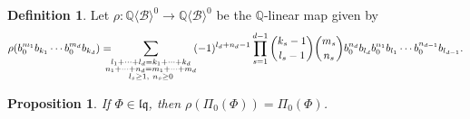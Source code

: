 \documentclass[12pt,reqno]{amsart}
\newtheorem{prop}[thm]{Proposition}
\numberwithin{equation}{section}
\theoremstyle{definition}
\newtheorem{defi}[thm]{Definition}
\newcommand{\QQ}{\mathbb{Q}}
\newcommand{\B}{\mathcal{B}}
\newcommand{\QB}{\QQ\langle \B\rangle}
\newcommand{\lqq}{\mathfrak{lq}}
\newcommand{\pizero}{\Pi_0}
\begin{document}
\begin{defi} \label{def:rho} Let $\rho:\QB^0\to \QB^0$ be the $\QQ$-linear map given by
\[\rho(b_0^{m_1}b_{k_1}\cdots b_0^{m_d}b_{k_d})=\hspace{-0.3cm}\sum_{\substack{l_1+\cdots+l_d=k_1+\cdots+k_d \\ n_1+\cdots+n_d=m_1+\cdots+m_d \\ l_s\geq1,\ n_s\geq0}} \hspace{-0.1cm} (-1)^{l_d+n_d-1}\prod_{s=1}^{d-1} \binom{k_s-1}{l_s-1}\binom{m_s}{n_s} b_0^{n_d}b_{l_d}b_0^{n_1}b_{l_1}\cdots b_0^{n_{d-1}}b_{l_{d-1}}.\]
\end{defi}

\begin{prop} \label{prop:lq_rho_inv} If $\Phi\in \lqq$, then $\rho(\pizero(\Phi))=\pizero(\Phi)$.
\end{prop}
\end{document}

